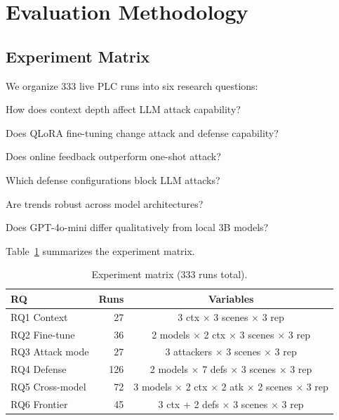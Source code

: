 \section{Evaluation Methodology}
\label{sec:methodology}

\subsection{Experiment Matrix}

We organize 333 live PLC runs into six research questions:

\begin{description}[leftmargin=1.2em,nosep,style=nextline]
    \item[RQ1 (Context):] How does context depth affect LLM attack capability?
    \item[RQ2 (Fine-tuning):] Does QLoRA fine-tuning change attack and defense capability?
    \item[RQ3 (Attack mode):] Does online feedback outperform one-shot attack?
    \item[RQ4 (Defense):] Which defense configurations block LLM attacks?
    \item[RQ5 (Cross-model):] Are trends robust across model architectures?
    \item[RQ6 (Frontier):] Does GPT-4o-mini differ qualitatively from local 3B models?
\end{description}

\noindent Table~\ref{tab:matrix} summarizes the experiment matrix.

\begin{table}[t]
\centering
\caption{Experiment matrix (333 runs total).}
\label{tab:matrix}
\small
\begin{tabular}{@{}lrc@{}}
\toprule
\textbf{RQ} & \textbf{Runs} & \textbf{Variables} \\
\midrule
RQ1 Context     & 27  & 3 ctx $\times$ 3 scenes $\times$ 3 rep \\
RQ2 Fine-tune   & 36  & 2 models $\times$ 2 ctx $\times$ 3 scenes $\times$ 3 rep \\
RQ3 Attack mode & 27  & 3 attackers $\times$ 3 scenes $\times$ 3 rep \\
RQ4 Defense     & 126 & 2 models $\times$ 7 defs $\times$ 3 scenes $\times$ 3 rep \\
RQ5 Cross-model & 72  & 3 models $\times$ 2 ctx $\times$ 2 atk $\times$ 2 scenes $\times$ 3 rep \\
RQ6 Frontier    & 45  & 3 ctx + 2 defs $\times$ 3 scenes $\times$ 3 rep \\
\bottomrule
\end{tabular}
\end{table}

